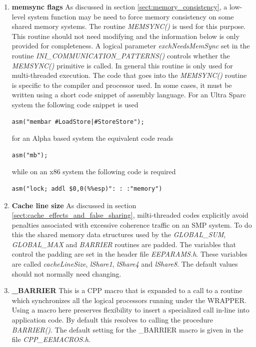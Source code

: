 \begin{enumerate}
\item {\bf memsync flags}
  As discussed in section \ref{sect:memory_consistency}, a low-level
  system function may be need to force memory consistency on some
  shared memory systems.  The routine {\em MEMSYNC()} is used for this
  purpose. This routine should not need modifying and the information
  below is only provided for completeness. A logical parameter {\em
    exchNeedsMemSync} set in the routine {\em
    INI\_COMMUNICATION\_PATTERNS()} controls whether the {\em
    MEMSYNC()} primitive is called. In general this routine is only
  used for multi-threaded execution.  The code that goes into the {\em
    MEMSYNC()} routine is specific to the compiler and processor used.
  In some cases, it must be written using a short code snippet of
  assembly language.  For an Ultra Sparc system the following code
  snippet is used
\begin{verbatim}
asm("membar #LoadStore|#StoreStore");
\end{verbatim}
for an Alpha based system the equivalent code reads
\begin{verbatim}
asm("mb");
\end{verbatim}
while on an x86 system the following code is required
\begin{verbatim}
asm("lock; addl $0,0(%%esp)": : :"memory")
\end{verbatim}

\item {\bf Cache line size}
  As discussed in section \ref{sect:cache_effects_and_false_sharing},
  milti-threaded codes explicitly avoid penalties associated with
  excessive coherence traffic on an SMP system. To do this the shared
  memory data structures used by the {\em GLOBAL\_SUM}, {\em
    GLOBAL\_MAX} and {\em BARRIER} routines are padded. The variables
  that control the padding are set in the header file {\em
    EEPARAMS.h}. These variables are called {\em cacheLineSize}, {\em
    lShare1}, {\em lShare4} and {\em lShare8}. The default values
  should not normally need changing.

\item {\bf \_BARRIER}
  This is a CPP macro that is expanded to a call to a routine which
  synchronizes all the logical processors running under the WRAPPER.
  Using a macro here preserves flexibility to insert a specialized
  call in-line into application code. By default this resolves to
  calling the procedure {\em BARRIER()}. The default setting for the
  \_BARRIER macro is given in the file {\em CPP\_EEMACROS.h}.


\end{enumerate}

